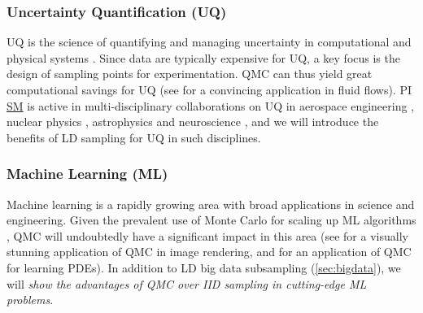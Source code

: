 \documentclass[11pt]{NSFamsart}
\newcommand{\SM}{\hyperlink{SMlink}{SM}\xspace}
\newcommand{\AGSNote}[1]{{\color{cyan}Aleksei: #1}}
\newcommand{\SMNote}[1]{{\color{blue}Simon: #1}}
\begin{document}
\subsubsection{Uncertainty Quantification (UQ)} UQ is the science of quantifying and managing uncertainty in computational and physical systems \cite{smartuq, Smi14a}. Since data are typically expensive for UQ, a key focus is the design of sampling points for experimentation. QMC can thus yield great computational savings for UQ (see \cite{HerSch20a} for a convincing application in fluid flows). PI \SM is active in multi-disciplinary collaborations on UQ in aerospace engineering \cite{li2017two,li2018uncertainty,chang2019kernel,yeh2018common,mak2018efficient}, nuclear physics \cite{ji2021graphical,everett2021multisystem,everett2021phenomenological,cao2021determining}, astrophysics \citep{mak2018maximum,zheng2021online,makinformation} and neuroscience \cite{wang2020uncertainty,wang2021sequential}, and we will introduce the benefits of LD sampling for UQ in such disciplines.
\subsubsection{Machine Learning (ML)} Machine learning is a rapidly growing area with broad applications in science and engineering. Given the prevalent use of Monte Carlo for scaling up ML algorithms \cite{Bot2010,friedman2002stochastic,quiroz2018speeding}, QMC will undoubtedly have a significant impact in this area (see \cite{Keller2013a} for a visually stunning application of QMC in image rendering, and \cite{chen2019quasi} for an application of QMC for learning PDEs). In addition to LD big data subsampling (\cref{sec:bigdata}), we will \textit{show the advantages of QMC over IID sampling in cutting-edge ML problems}.

\end{document}
